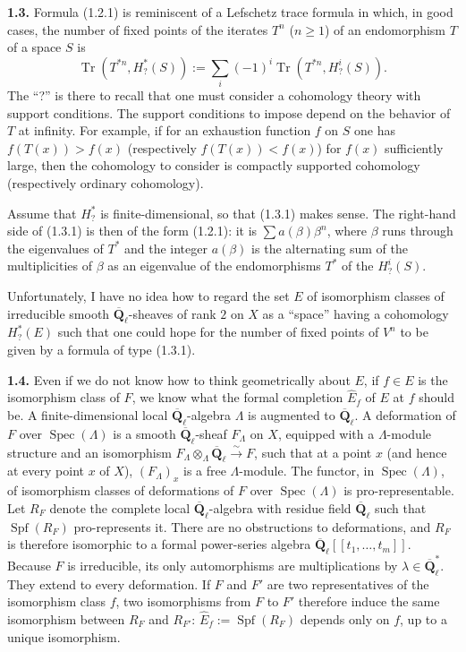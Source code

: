 \documentclass[11pt]{article}
\newcommand{\Qbl}{\overline{\mathbf{Q}}_{\ell}}
\newcommand{\Spec}{\operatorname{Spec}}
\newcommand{\Tr}{\operatorname{Tr}}
\newcommand{\para}[1]{\medskip\noindent\textbf{#1}\enspace}
\begin{document}
\para{1.3.} Formula (1.2.1) is reminiscent of a Lefschetz trace formula in which, in good cases, the number of fixed points of the iterates \(T^n\) (\(n\ge 1\)) of an endomorphism \(T\) of a space \(S\) is
\begin{equation}
\Tr(T^{*n},H^*_?(S)):=\sum_i(-1)^i\Tr(T^{*n},H^i_?(S)).
\tag{1.3.1}
\end{equation}
The ``?'' is there to recall that one must consider a cohomology theory with support conditions. The support conditions to impose depend on the behavior of \(T\) at infinity. For example, if for an exhaustion function \(f\) on \(S\) one has \(f(T(x))>f(x)\) (respectively \(f(T(x))<f(x)\)) for \(f(x)\) sufficiently large, then the cohomology to consider is compactly supported cohomology (respectively ordinary cohomology).

Assume that \(H^*_?\) is finite-dimensional, so that (1.3.1) makes sense. The right-hand side of (1.3.1) is then of the form (1.2.1): it is \(\sum a(\beta)\beta^n\), where \(\beta\) runs through the eigenvalues of \(T^*\) and the integer \(a(\beta)\) is the alternating sum of the multiplicities of \(\beta\) as an eigenvalue of the endomorphisms \(T^*\) of the \(H^i_?(S)\).

Unfortunately, I have no idea how to regard the set \(E\) of isomorphism classes of irreducible smooth \(\Qbl\)-sheaves of rank \(2\) on \(X\) as a ``space'' having a cohomology \(H^*_?(E)\) such that one could hope for the number of fixed points of \(V^n\) to be given by a formula of type (1.3.1).

\para{1.4.} Even if we do not know how to think geometrically about \(E\), if \(f\in E\) is the isomorphism class of \(F\), we know what the formal completion \(\widehat{E}_f\) of \(E\) at \(f\) should be. A finite-dimensional local \(\Qbl\)-algebra \(\Lambda\) is augmented to \(\Qbl\). A deformation of \(F\) over \(\Spec(\Lambda)\) is a smooth \(\Qbl\)-sheaf \(F_\Lambda\) on \(X\), equipped with a \(\Lambda\)-module structure and an isomorphism \(F_\Lambda\otimes_\Lambda\Qbl\overset{\sim}{\longrightarrow}F\), such that at a point \(x\) (and hence at every point \(x\) of \(X\)), \((F_\Lambda)_x\) is a free \(\Lambda\)-module. The functor, in \(\Spec(\Lambda)\), of isomorphism classes of deformations of \(F\) over \(\Spec(\Lambda)\) is pro-representable. Let \(R_F\) denote the complete local \(\Qbl\)-algebra with residue field \(\Qbl\) such that \(\operatorname{Spf}(R_F)\) pro-represents it. There are no obstructions to deformations, and \(R_F\) is therefore isomorphic to a formal power-series algebra \(\Qbl[[t_1,\ldots,t_m]]\). Because \(F\) is irreducible, its only automorphisms are multiplications by \(\lambda\in\Qbl^*\). They extend to every deformation. If \(F\) and \(F'\) are two representatives of the isomorphism class \(f\), two isomorphisms from \(F\) to \(F'\) therefore induce the same isomorphism between \(R_F\) and \(R_{F'}\): \(\widehat{E}_f:=\operatorname{Spf}(R_F)\) depends only on \(f\), up to a unique isomorphism.
\end{document}

